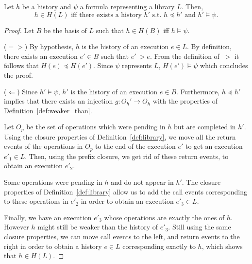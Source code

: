 \begin{theorem}\label{lemma:kernel_histories}

Let $h$ be a history and $\psi$ a formula representing a library $L$. Then, 
\[
h\in H(L)\mbox{ iff there exists a history $h'$ s.t. }h\preceq h'\mbox{ and }h'\models\psi.
\]

\end{theorem}

\begin{proof}
Let $B$ be the basis of $L$
such that $h\in H(B)$ iff $h\models \psi$.

($=>$) By hypothesis, $h$ is the history of an execution $e\in L$.  By definition, there exists
an execution $e'\in B$ such that $e' ~> e$. From the definition of $~>$ it follows that $H(e)\preceq H(e')$.
Since $\psi$ represents $L$, $H(e')\models\psi$ which concludes the proof.


($\Leftarrow$) Since $h'\models\psi$, $h'$ is the history of an execution $e\in B$. Furthermore,
 $h\preceq h'$ implies that there exists an injection $g: O_h' \rightarrow O_h$ with the 
properties of Definition~\ref{def:weaker_than}. 

Let $O_p$ be the set of operations which were pending in $h$ but are completed in $h'$.
Using the closure properties of Definition~\ref{def:library}, we move all the return
events of the operations in $O_p$ to the end of the execution $e'$ to get an 
execution $e'_1 \in L$.
Then, using the prefix closure, we get rid of these return events, to obtain an 
execution $e'_2$.

Some operations were pending in $h$ and do not appear in $h'$. The closure
properties of Definition~\ref{def:library} allow us to add the call events corresponding
to these operations in $e'_2$ in order to obtain an execution $e'_3 \in L$.

Finally, we have an execution $e'_3$ whose operations are exactly the ones of $h$.
However $h$ might still be weaker than the history of $e'_3$. Still using the same 
closure properties, we can move call events to the left, and return events to the right
in order to obtain a history $e \in L$ corresponding exactly to $h$, which shows
that $h \in H(L)$.
\end{proof}

